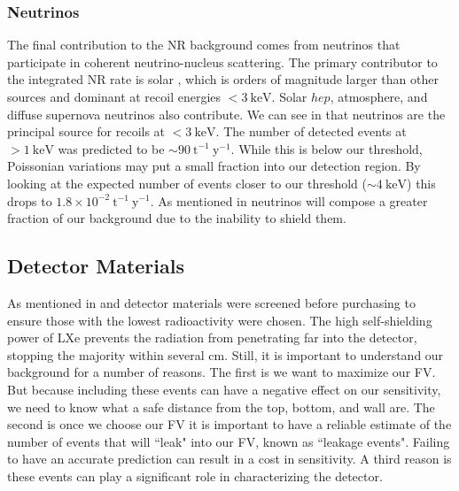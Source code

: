 \subsubsection{Neutrinos}
\label{subsubsec:backgrounds_nuclear_neutrinos}
The final contribution to the NR background comes from neutrinos that participate in coherent neutrino-nucleus scattering.  The primary
contributor to the integrated NR rate is solar , which is orders of magnitude larger than other sources and dominant at
recoil energies $< 3\ \mathrm{keV}$.  Solar $hep$, atmosphere, and diffuse supernova neutrinos also contribute.  We can see in
 that neutrinos are the principal source for recoils at $< 3\ \mathrm{keV}$.  The
number of detected events at $> 1\ \mathrm{keV}$ was predicted to be ${\sim} 90\ \mathrm{t^{-1}\ y^{-1}}$.  While this is below our
threshold, Poissonian variations may put a small fraction into our detection region.  By looking at the expected number of events closer
to our threshold (${\sim} 4\ \mathrm{keV}$) this drops to $1.8 \times 10^{-2}\ \mathrm{t^{-1}\ y^{-1}}$.  As mentioned in
 neutrinos will compose a greater fraction of our background due to the inability
to shield them.



\subsection{Detector Materials}
\label{subsec:backgrounds_detector_materials}
As mentioned in  and  detector materials were screened before purchasing to ensure
those with the lowest radioactivity were chosen.  The high self-shielding power of LXe prevents the radiation from penetrating far into
the detector, stopping the majority within several cm.  Still, it is important to understand our background for a number of reasons.  The
first is we want to maximize our FV.  But because including these events can have a negative effect on our sensitivity, we need to know
what a safe distance from the top, bottom, and wall are.  The second is once we choose our FV it is important to have a reliable estimate
of the number of events that will ``leak" into our FV, known as ``leakage events".  Failing to have an accurate prediction can result in
a cost in sensitivity.  A third reason is these events can play a significant role in characterizing the detector.

